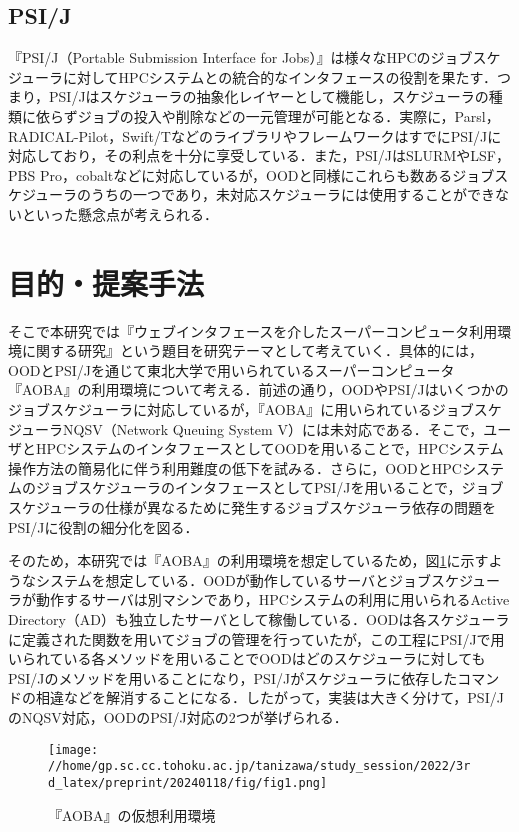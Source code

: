 \documentclass[a4paper,oneside,twocolumn,notitlepage,dvipdfmx]{jsarticle}
\begin{document}
\subsection{PSI/J}
『PSI/J（Portable Submission Interface for Jobs）』\cite{citation_6}は様々なHPCのジョブスケジューラに対してHPCシステムとの統合的なインタフェースの役割を果たす．つまり，PSI/Jはスケジューラの抽象化レイヤーとして機能し，スケジューラの種類に依らずジョブの投入や削除などの一元管理が可能となる．実際に，Parsl，RADICAL-Pilot，Swift/TなどのライブラリやフレームワークはすでにPSI/Jに対応しており，その利点を十分に享受している．また，PSI/JはSLURMやLSF，PBS Pro，cobaltなどに対応しているが，OODと同様にこれらも数あるジョブスケジューラのうちの一つであり，未対応スケジューラには使用することができないといった懸念点が考えられる．

\section{目的・提案手法}
そこで本研究では『ウェブインタフェースを介したスーパーコンピュータ利用環境に関する研究』という題目を研究テーマとして考えていく．具体的には，OODとPSI/Jを通じて東北大学で用いられているスーパーコンピュータ『AOBA』の利用環境について考える．前述の通り，OODやPSI/Jはいくつかのジョブスケジューラに対応しているが，『AOBA』に用いられているジョブスケジューラNQSV（Network Queuing System V）には未対応である．そこで，ユーザとHPCシステムのインタフェースとしてOODを用いることで，HPCシステム操作方法の簡易化に伴う利用難度の低下を試みる．さらに，OODとHPCシステムのジョブスケジューラのインタフェースとしてPSI/Jを用いることで，ジョブスケジューラの仕様が異なるために発生するジョブスケジューラ依存の問題をPSI/Jに役割の細分化を図る．\par
そのため，本研究では『AOBA』の利用環境を想定しているため，図\ref{fig1}に示すようなシステムを想定している．OODが動作しているサーバとジョブスケジューラが動作するサーバは別マシンであり，HPCシステムの利用に用いられるActive Directory（AD）も独立したサーバとして稼働している．OODは各スケジューラに定義された関数を用いてジョブの管理を行っていたが，この工程にPSI/Jで用いられている各メソッドを用いることでOODはどのスケジューラに対してもPSI/Jのメソッドを用いることになり，PSI/Jがスケジューラに依存したコマンドの相違などを解消することになる．したがって，実装は大きく分けて，PSI/JのNQSV対応，OODのPSI/J対応の2つが挙げられる．\par

\begin{figure}[h]
  \centering
  \texttt{[image: //home/gp.sc.cc.tohoku.ac.jp/tanizawa/study\_session/2022/3rd\_latex/preprint/20240118/fig/fig1.png]}
  \caption{『AOBA』の仮想利用環境}
  \label{fig1}
\end{figure}
\end{document}
